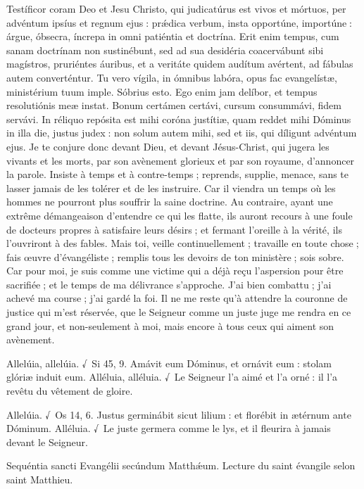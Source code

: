\begin{paracol}{2}
Testíficor coram Deo et Jesu  Christo, qui judicatúrus est vivos et mórtuos, per advéntum ipsíus et regnum ejus : prǽdica verbum, insta opportúne, importúne : árgue, óbsecra, íncrepa in omni patiéntia et doctrína. Erit enim tempus, cum sanam doctrínam non sustinébunt, sed ad sua desidéria coacervábunt sibi magístros, pruriéntes áuribus, et a veritáte quidem audítum avértent, ad fábulas autem converténtur. Tu vero vígila, in ómnibus labóra, opus fac evangelístæ, ministérium tuum imple. Sóbrius esto. Ego enim jam delíbor, et tempus resolutiónis meæ instat. Bonum certámen certávi, cursum consummávi, fidem servávi. In réliquo repósita est mihi coróna justítiæ, quam reddet mihi Dóminus in illa die, justus judex : non solum autem mihi, sed et iis, qui díligunt advéntum ejus.
\switchcolumn
Je te conjure donc devant Dieu, et devant  Jésus-Christ, qui jugera les vivants et les morts, par son avènement glorieux et par son royaume, d’annoncer la parole. Insiste à temps et à contre-temps ; reprends, supplie, menace, sans te lasser jamais de les tolérer et de les instruire. Car il viendra un temps où les hommes ne pourront plus souffrir la saine doctrine. Au contraire, ayant une extrême démangeaison d’entendre ce qui les flatte, ils auront recours à une foule de docteurs propres à satisfaire leurs désirs ; et fermant l’oreille à la vérité, ils l’ouvriront à des fables. Mais toi, veille continuellement ; travaille en toute chose ; fais œuvre d’évangéliste ; remplis tous les devoirs de ton ministère ; sois sobre. Car pour moi, je suis comme une victime qui a déjà reçu l’aspersion pour être sacrifiée ; et le temps de ma délivrance s’approche. J’ai bien combattu ; j’ai achevé ma course ; j’ai gardé la foi. Il ne me reste qu’à attendre la couronne de justice qui m’est réservée, que le Seigneur comme un juste juge me rendra en ce grand jour, et non-seulement à moi, mais encore à tous ceux qui aiment son avènement.
\switchcolumn*

Allelúia, allelúia. √~Si 45, 9. Amávit eum Dóminus, et ornávit eum : stolam glóriæ induit eum.
\switchcolumn
Alléluia, alléluia. √~Le Seigneur l’a aimé et l’a orné : il l’a revêtu du vêtement de gloire.
\switchcolumn*

Allelúia. √~Os 14, 6. Justus germinábit sicut lilium : et florébit in ætérnum ante Dóminum.
\switchcolumn
Alléluia. √~Le juste germera comme le lys, et il fleurira à jamais devant le Seigneur.
\switchcolumn*

Sequéntia sancti Evangélii secúndum Matthǽum.
\switchcolumn
Lecture du saint évangile selon saint Matthieu.
\switchcolumn*


\end{paracol}
